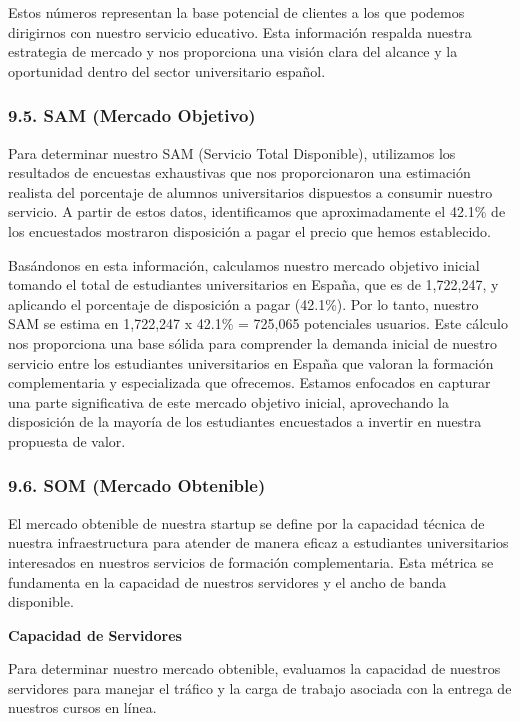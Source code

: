 \documentclass[
]{article}
\begin{document}
Estos números representan la base potencial de clientes a los que
podemos dirigirnos con nuestro servicio educativo. Esta información
respalda nuestra estrategia de mercado y nos proporciona una visión
clara del alcance y la oportunidad dentro del sector universitario
español.

\subsubsection{9.5. SAM (Mercado Objetivo)}\label{sam-mercado-objetivo}

Para determinar nuestro SAM (Servicio Total Disponible), utilizamos los
resultados de encuestas exhaustivas que nos proporcionaron una
estimación realista del porcentaje de alumnos universitarios dispuestos
a consumir nuestro servicio. A partir de estos datos, identificamos que
aproximadamente el 42.1\% de los encuestados mostraron disposición a
pagar el precio que hemos establecido.

Basándonos en esta información, calculamos nuestro mercado objetivo
inicial tomando el total de estudiantes universitarios en España, que es
de 1,722,247, y aplicando el porcentaje de disposición a pagar (42.1\%).
Por lo tanto, nuestro SAM se estima en 1,722,247 x 42.1\% = 725,065
potenciales usuarios. Este cálculo nos proporciona una base sólida para
comprender la demanda inicial de nuestro servicio entre los estudiantes
universitarios en España que valoran la formación complementaria y
especializada que ofrecemos. Estamos enfocados en capturar una parte
significativa de este mercado objetivo inicial, aprovechando la
disposición de la mayoría de los estudiantes encuestados a invertir en
nuestra propuesta de valor.

\subsubsection{9.6. SOM (Mercado
Obtenible)}\label{som-mercado-obtenible}

El mercado obtenible de nuestra startup se define por la capacidad
técnica de nuestra infraestructura para atender de manera eficaz a
estudiantes universitarios interesados en nuestros servicios de
formación complementaria. Esta métrica se fundamenta en la capacidad de
nuestros servidores y el ancho de banda disponible.

\newpage

\textbf{Capacidad de Servidores}

Para determinar nuestro mercado obtenible, evaluamos la capacidad de
nuestros servidores para manejar el tráfico y la carga de trabajo
asociada con la entrega de nuestros cursos en línea.
\end{document}
